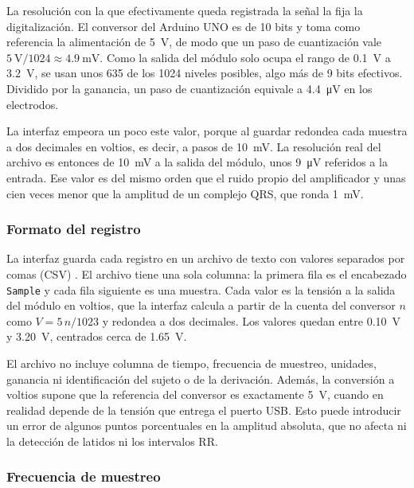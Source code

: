 La resolución con la que efectivamente queda registrada la señal la fija la digitalización. El conversor del Arduino UNO es de 10 bits y toma como referencia la alimentación de \SI{5}{\volt}, de modo que un paso de cuantización vale $\SI{5}{\volt}/1024 \approx \SI{4.9}{\milli\volt}$. Como la salida del módulo solo ocupa el rango de \SI{0.1}{\volt} a \SI{3.2}{\volt}, se usan unos 635 de los 1024 niveles posibles, algo más de 9 bits efectivos. Dividido por la ganancia, un paso de cuantización equivale a \SI{4.4}{\micro\volt} en los electrodos.

La interfaz empeora un poco este valor, porque al guardar redondea cada muestra a dos decimales en voltios, es decir, a pasos de \SI{10}{\milli\volt}. La resolución real del archivo es entonces de \SI{10}{\milli\volt} a la salida del módulo, unos \SI{9}{\micro\volt} referidos a la entrada. Ese valor es del mismo orden que el ruido propio del amplificador y unas cien veces menor que la amplitud de un complejo QRS, que ronda \SI{1}{\milli\volt}.

\subsubsection{Formato del registro}
\label{sec:formato}

La interfaz guarda cada registro en un archivo de texto con valores separados por comas (CSV) \parencite{tassara_ecg}. El archivo tiene una sola columna: la primera fila es el encabezado \texttt{Sample} y cada fila siguiente es una muestra. Cada valor es la tensión a la salida del módulo en voltios, que la interfaz calcula a partir de la cuenta del conversor $n$ como $V = 5\,n/1023$ y redondea a dos decimales. Los valores quedan entre \SI{0.10}{\volt} y \SI{3.20}{\volt}, centrados cerca de \SI{1.65}{\volt}.

El archivo no incluye columna de tiempo, frecuencia de muestreo, unidades, ganancia ni identificación del sujeto o de la derivación. Además, la conversión a voltios supone que la referencia del conversor es exactamente \SI{5}{\volt}, cuando en realidad depende de la tensión que entrega el puerto USB. Esto puede introducir un error de algunos puntos porcentuales en la amplitud absoluta, que no afecta ni la detección de latidos ni los intervalos RR.

\subsubsection{Frecuencia de muestreo}
\label{sec:fs}

